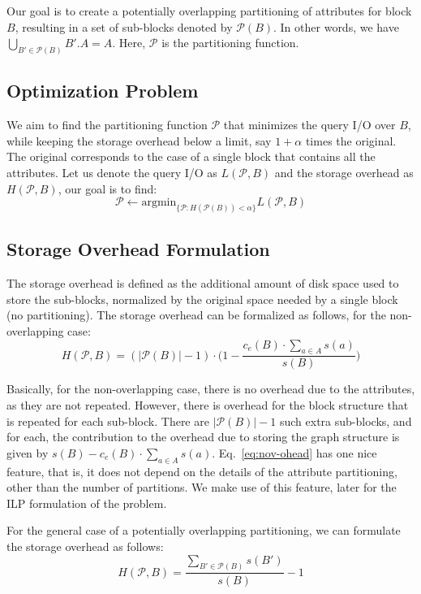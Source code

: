 Our goal is to create a potentially overlapping partitioning of attributes for
block $B$, resulting in a set of sub-blocks denoted by $\mathcal{P}(B)$. In
other words, we have $\bigcup_{B'\in \mathcal{P}(B)} B'.A = A$. Here,
$\mathcal{P}$ is the partitioning function.

\subsection{Optimization Problem}
\noindent
We aim to find the partitioning function $\mathcal{P}$ that minimizes the query
I/O over $B$, while keeping the storage overhead below a limit, say
$1+\alpha$ times the original. The original corresponds to the case of a single
block that contains all the attributes. Let us denote the query I/O as
$L(\mathcal{P}, B)$ and the storage overhead as $H(\mathcal{P}, B)$,
our goal is to find: 
\begin{equation} 
\mathcal{P} \leftarrow \mbox{argmin}_{\{\mathcal{P}: H(\mathcal{P}(B)) < \alpha\}} L(\mathcal{P},B)
\end{equation}

\subsection{Storage Overhead Formulation}
\noindent
The storage overhead is defined as the additional amount of disk space used to
store the sub-blocks, normalized by the original space needed by a single
block (no partitioning). The storage overhead can be formalized as follows,
for the non-overlapping case:
\begin{equation}
H(\mathcal{P}, B) = (|\mathcal{P}(B)|-1)\cdot\Big(1-\frac{c_e(B)\cdot \sum_{a\in A} s(a)}{s(B)}\Big)
\label{eq:nov-ohead}
\end{equation}

Basically, for the non-overlapping case, there is no overhead due to the
attributes, as they are not repeated. However, there is overhead for the block
structure that is repeated for each sub-block. There are $|\mathcal{P}(B)|-1$
such extra sub-blocks, and for each, the contribution to the overhead due to
storing the graph structure is given by $s(B)-c_e(B)\cdot \sum_{a\in A} s(a)$.
Eq.~\ref{eq:nov-ohead} has one nice feature, that is, it does not depend on the
details of the attribute partitioning, other than the number of partitions. We
make use of this feature, later for the ILP formulation of the problem.

For the general case of a potentially overlapping partitioning, we can
formulate the storage overhead as follows:
\begin{equation}
H(\mathcal{P}, B) = \frac{\sum_{B'\in \mathcal{P}(B)} s(B')}{s(B)} - 1 
\end{equation}

